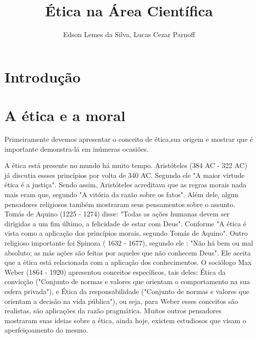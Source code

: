 \documentclass[12pt]{article}
\title{Ética na Área Científica}
\author{Edson Lemes da Silva\inst{1}, Lucas Cezar Parnoff\inst{1}  }
\begin{document}
 

\maketitle

\begin{abstract}
  
\end{abstract}
     
\begin{resumo} 
  
\end{resumo}


\section{Introdução}

\section{A ética e a moral}\label{sec:conteudo}


Primeiramente devemos apresentar o conceito de ética,sua origem e mostrar que é importante demonstra-lá em inúmeras ocasiões.

A ética está presente no mundo há muito tempo. Aristóteles  (384 AC - 322 AC) já discutia essses princípios por volta de 340 AC. Segundo ele "A maior virtude ética é a justiça". Sendo assim, Aristóteles acreditava que as regras morais nada mais eram que, segundo \cite{FABIO} "A vitória da razão sobre os fatos". Além dele, algun pensadores religiosos também mostraram seus pensamentos sobre o assunto. Tomás de Aquino (1225 - 1274) disse: "Todas as ações humanas devem ser dirigidas a um fim último, a felicidade de estar com Deus". Conforme \cite{ORLANDO} "A ética é vista como a aplicação dos princípios morais, segundo Tomás de Aquino". Outro religioso importante foi Spinoza ( 1632 - 1677), segundo ele : "Não há bem ou mal absoluto; as más ações são feitas por aqueles que não conhecem Deus". Ele aceita que a ética está relacionada com a aplicação dos conhecimentos. O sociólogo Max Weber (1864 - 1920) apresentou conceitos específicos, tais deles: Ética da convicção ("Conjunto de normas e valores que orientam o comportamento na sua esfera privada"), e Ética da responsabilidade ("Conjunto de normas e valores que orientam a decisão na vida pública"), ou seja, para Weber esses conceitos são realistas, são aplicações da razão pragmática. Muitos outros pensadores mostraram suas ideias sobre a ética, ainda hoje, existem estudiosos que visam o aperfeiçoamento do mesmo.
\end{document}
